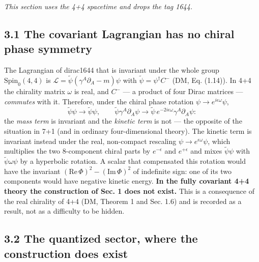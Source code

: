 \documentclass[
  10pt,
]{article}
\begin{document}
\emph{This section uses the 4+4 spacetime and drops the tag 1644.}

\hypertarget{the-covariant-lagrangian-has-no-chiral-phase-symmetry}{%
\subsection{3.1 The covariant Lagrangian has no chiral phase
symmetry}\label{the-covariant-lagrangian-has-no-chiral-phase-symmetry}}

The Lagrangian of dirac1644 that is invariant under the whole group
\(\mathrm{Spin}_0(4,4)\) is
\(\mathcal L=\tilde\psi(\gamma^A\partial_A-m)\psi\) with
\(\tilde\psi=\psi^\dagger C^{-}\) (DM, Eq. (1.14)). In 4+4 the chirality
matrix \(\omega\) is real, and \(C^{-}\) --- a product of four Dirac
matrices --- \emph{commutes} with it. Therefore, under the chiral phase
rotation \(\psi\to e^{i\epsilon\omega}\psi\),
\[\tilde\psi\psi\to\tilde\psi\psi,\qquad\tilde\psi\gamma^A\partial_A\psi\to\tilde\psi\,e^{-2i\epsilon\omega}\gamma^A\partial_A\psi :\]
the \emph{mass term} is invariant and the \emph{kinetic term} is not ---
the opposite of the situation in 7+1 (and in ordinary four-dimensional
theory). The kinetic term is invariant instead under the real,
non-compact rescaling \(\psi\to e^{\epsilon\omega}\psi\), which
multiplies the two 8-component chiral parts by \(e^{-\epsilon}\) and
\(e^{+\epsilon}\) and mixes \(\tilde\psi\psi\) with
\(\tilde\psi\omega\psi\) by a hyperbolic rotation. A scalar that
compensated this rotation would have the invariant
\((\mathrm{Re}\,\Phi)^2-(\mathrm{Im}\,\Phi)^2\) of indefinite sign: one
of its two components would have negative kinetic energy. \textbf{In the
fully covariant 4+4 theory the construction of Sec. 1 does not exist.}
This is a consequence of the real chirality of 4+4 (DM, Theorem 1 and
Sec. 1.6) and is recorded as a result, not as a difficulty to be hidden.

\hypertarget{the-quantized-sector-where-the-construction-does-exist}{%
\subsection{3.2 The quantized sector, where the construction does
exist}\label{the-quantized-sector-where-the-construction-does-exist}}
\end{document}
